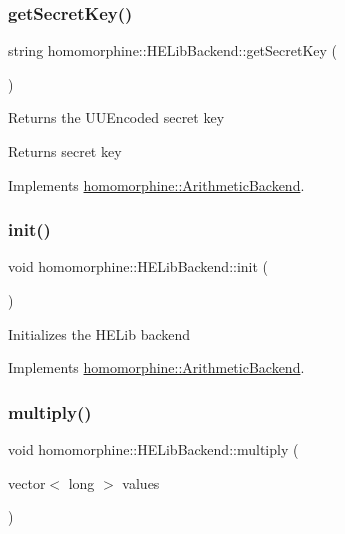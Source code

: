 \subsubsection{\texorpdfstring{get\+Secret\+Key()}{getSecretKey()}}
{\footnotesize\ttfamily string homomorphine\+::\+H\+E\+Lib\+Backend\+::get\+Secret\+Key (\begin{DoxyParamCaption}{ }\end{DoxyParamCaption})\hspace{0.3cm}{\ttfamily [virtual]}}

Returns the U\+U\+Encoded secret key

\begin{DoxyReturn}{Returns}
secret key 
\end{DoxyReturn}


Implements \hyperlink{classhomomorphine_1_1_arithmetic_backend_a679abf60fea83922f7972498c4500252}{homomorphine\+::\+Arithmetic\+Backend}.

\mbox{\label{classhomomorphine_1_1_h_e_lib_backend_a6a7e7c8095f2287c41f7d93be91418ec}} 
\subsubsection{\texorpdfstring{init()}{init()}}
{\footnotesize\ttfamily void homomorphine\+::\+H\+E\+Lib\+Backend\+::init (\begin{DoxyParamCaption}{ }\end{DoxyParamCaption})\hspace{0.3cm}{\ttfamily [virtual]}}

Initializes the H\+E\+Lib backend 

Implements \hyperlink{classhomomorphine_1_1_arithmetic_backend_a2654ee62a6cf2f16fd41c834a26b0006}{homomorphine\+::\+Arithmetic\+Backend}.

\mbox{\label{classhomomorphine_1_1_h_e_lib_backend_a05b508bcc4a165d045ebc09f190c5a95}} 
\subsubsection{\texorpdfstring{multiply()}{multiply()}\hspace{0.1cm}{\footnotesize\ttfamily [1/2]}}
{\footnotesize\ttfamily void homomorphine\+::\+H\+E\+Lib\+Backend\+::multiply (\begin{DoxyParamCaption}\item[{vector$<$ long $>$}]{values }\end{DoxyParamCaption})\hspace{0.3cm}{\ttfamily [virtual]}}

